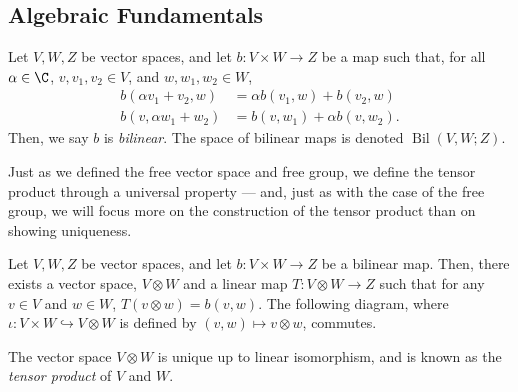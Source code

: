 \subsection{Algebraic Fundamentals}%
\begin{definition}\label{def:bilinear_map}
  Let $V,W,Z$ be vector spaces, and let $b\colon V\times W\rightarrow Z$ be a map such that, for all $\alpha\in \C$, $v,v_1,v_2\in V$, and $w,w_1,w_2\in W$,
  \begin{align*}
    b\left( \alpha v_1 + v_2,w \right) &= \alpha b\left( v_1,w \right) + b\left( v_2,w \right)\\
    b\left( v,\alpha w_1 + w_2 \right) &= b\left( v,w_1 \right) + \alpha b\left( v,w_2 \right).
  \end{align*}
  Then, we say $b$ is \textit{bilinear}. The space of bilinear maps is denoted $\operatorname{Bil}\left( V,W;Z \right)$.
\end{definition}
Just as we defined the free vector space and free group, we define the tensor product through a universal property --- and, just as with the case of the free group, we will focus more on the construction of the tensor product than on showing uniqueness.
\begin{theorem}\label{thm:tensor_product_existence}
  Let $V,W,Z$ be vector spaces, and let $b\colon V\times W \rightarrow Z$ be a bilinear map. Then, there exists a vector space, $V\otimes W$ and a linear map $T\colon V\otimes W \rightarrow Z$ such that for any $v\in V$ and $w\in W$, $T\left( v\otimes w \right) = b\left( v,w \right)$. The following diagram, where $\iota\colon V\times W \hookrightarrow V\otimes W$ is defined by $\left( v,w \right)\mapsto v\otimes w$, commutes.
  \begin{center}
  \end{center}
  The vector space $V\otimes W$ is unique up to linear isomorphism, and is known as the \textit{tensor product} of $V$ and $W$.
\end{theorem}
